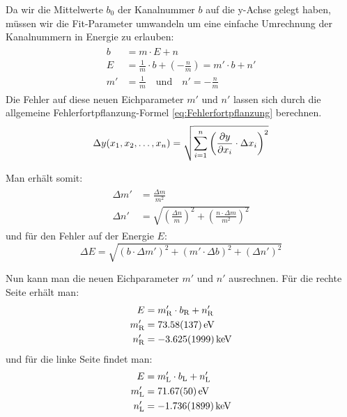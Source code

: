 Da wir die Mittelwerte $b_0$ der Kanalnummer $b$ auf die y-Achse gelegt haben, müssen wir die Fit-Parameter umwandeln um eine einfache Umrechnung der Kanalnummern in Energie zu erlauben:
\begin{align}
    \begin{split}
        b &= m \cdot E + n\\
        E &= \frac{1}{m} \cdot b + \left(-\frac{n}{m}\right) = m' \cdot b + n'\\
        m' &= \frac{1}{m} \quad \text{und} \quad n' = -\frac{n}{m}
    \end{split}
    \label{eq:Energieumwandlung}
\end{align}
Die Fehler auf diese neuen Eichparameter $m'$ und $n'$ lassen sich durch die allgemeine Fehlerfortpflanzung-Formel \ref{eq:Fehlerfortpflanzung} berechnen.
\begin{equation}
    \Delta y(x_1, x_2,\ldots,x_n) = \sqrt{\sum_{i=1}^{n} \left(\pdv{y}{x_i} \cdot \Delta x_i\right)^2}
    \label{eq:Fehlerfortpflanzung}
\end{equation}

Man erhält somit:
\begin{align}
    \begin{split}
        \Delta m' &= \frac{\Delta m}{m^2} \\
        \Delta n' &= \sqrt{\left(\frac{\Delta n}{m}\right)^2 + \left(\frac{n \cdot \Delta m}{m^2}\right)^2}
    \end{split}
    \label{eq:FehlerEnergieumwandlung1}
\end{align}
und für den Fehler auf der Energie $E$:
\begin{equation}
    \Delta E = \sqrt{(b \cdot \Delta m')^2 + (m' \cdot \Delta b)^2 + (\Delta n')^2}
    \label{eq:FehlerEnergieumwandlung2}
\end{equation}

Nun kann man die neuen Eichparameter $m'$ und $n'$ ausrechnen.
Für die rechte Seite erhält man:
\begin{align}
    \begin{split}
        E &= m_\text{R}' \cdot b_\text{R} + n_\text{R}' \\
        m_\text{R}' &= \SI{73,58 \pm 1,37}{\eV} \\
        n_\text{R}' &= \SI{-3,625 \pm 1,999}{\kilo\eV}
    \end{split}
    \label{eq:EnergieeichungR}
\end{align}
und für die linke Seite findet man:
\begin{align}
    \begin{split}
        E &= m_\text{L}' \cdot b_\text{L} + n_\text{L}' \\
        m_\text{L}' &= \SI{71,67 \pm 0,50}{\eV} \\
        n_\text{L}' &= \SI{-1,736 \pm 1,899}{\kilo\eV}
    \end{split}
    \label{eq:EnergieeichungL}
\end{align}

